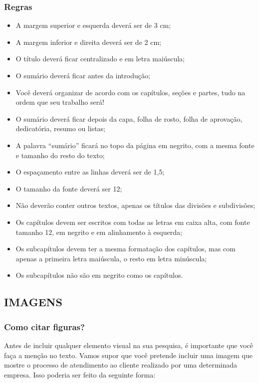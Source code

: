 \newpage

\subsubsection{Regras}

\begin{itemize}
    \item A margem superior e esquerda deverá ser de 3 cm;
    \item A margem inferior e direita deverá ser de 2 cm;
    \item O título deverá ficar centralizado e em letra maiúscula;
    \item O sumário deverá ficar antes da introdução;
    \item Você deverá organizar de acordo com os capítulos, seções e partes, tudo na ordem que seu trabalho será!
    \item O sumário deverá ficar depois da capa, folha de rosto, folha de aprovação, dedicatória, resumo ou listas;
    \item A palavra “sumário” ficará no topo da página em negrito, com a mesma fonte e tamanho do resto do texto;
    \item O espaçamento entre as linhas deverá ser de 1,5;
    \item O tamanho da fonte deverá ser 12;
    \item Não deverão conter outros textos, apenas os títulos das divisões e subdivisões;
    \item Os capítulos devem ser escritos com todas as letras em caixa alta, com fonte tamanho 12, em negrito e em alinhamento à esquerda;
    \item Os subcapítulos devem ter a mesma formatação dos capítulos, mas com apenas a primeira letra maiúscula, o resto em letra minúscula;
    \item Os subcapítulos não são em negrito como os capítulos.
\end{itemize}

\newpage

\subsection{IMAGENS}

\subsubsection{Como citar figuras?}

Antes de incluir qualquer elemento visual na sua pesquisa, é importante que você faça a menção no texto. Vamos supor que você pretende incluir uma imagem que mostre o processo de atendimento ao cliente realizado por uma determinada empresa. Isso poderia ser feito da seguinte forma:

